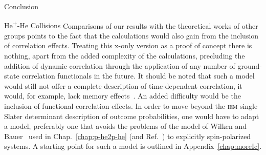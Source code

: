 \documentclass[letterpaper, 11 pt]{report}
\begin{document}
\begin{chapter}{Conclusion \label{chap:con}}
\begin{section}{\texorpdfstring{He\textsuperscript{+}}{He+}-He Collisions \label{sec:con-hephe}}
      Comparisons of our results with the theoretical works of other groups points to the fact that the
      calculations would also gain from the inclusion of correlation effects. Treating this x-only
      version as a proof of concept there is nothing, apart from the added complexity of the
      calculations, precluding the addition of dynamic correlation through the application of any number
      of ground-state correlation functionals in the future. It should be noted that such a model would
      still not offer a complete description of time-dependent correlation, it would, for example, lack
      memory effects~\cite{tddft}. An added difficulty would be the inclusion of functional correlation
      effects. In order to move beyond the \textsc{iem} single Slater determinant description of outcome
      probabilities, one would have to adapt a model, preferably one that avoids the problems of the
      model of Wilken and Bauer~\cite{wb} used in Chap.~\ref{chap:p-he2p-he} (and Ref.~\cite{p-he2p-he})
      to explicitly spin-polarized systems. A starting point for such a model is outlined in
      Appendix~\ref{chap:moreIc}.

   \end{section}

\end{chapter}
\end{document}
